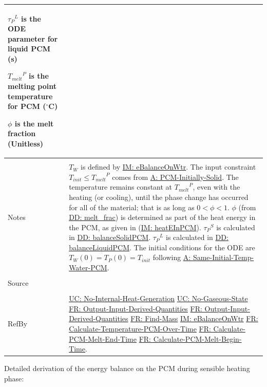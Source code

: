 \documentclass[12pt]{article}
\begin{document}
\begin{minipage}{\textwidth}
\begin{tabular}{p{} p{}}
\begin{symbDescription}
              \item{${{τ_{P}}^{L}}$ is the ODE parameter for liquid PCM (s)}
              \item{${{T_{melt}}^{P}}$ is the melting point temperature for PCM (${}^{\circ}$C)}
              \item{$ϕ$ is the melt fraction (Unitless)}
              \end{symbDescription}
\\ \midrule \\
Notes & ${T_{W}}$ is defined by \hyperref[IM:eBalanceOnWtr]{IM: eBalanceOnWtr}.
        The input constraint ${T_{init}}\leq{}{{T_{melt}}^{P}}$ comes from \hyperref[assumpPIS]{A: PCM-Initially-Solid}.
        The temperature remains constant at ${{T_{melt}}^{P}}$, even with the heating (or cooling), until the phase change has occurred for all of the material; that is as long as $0<ϕ<1$. $ϕ$ (from \hyperref[DD:melt.frac]{DD: melt\_frac}) is determined as part of the heat energy in the PCM, as given in (\hyperref[IM:heatEInPCM]{IM: heatEInPCM}).
        ${{τ_{P}}^{S}}$ is calculated in \hyperref[DD:balanceSolidPCM]{DD: balanceSolidPCM}.
        ${{τ_{P}}^{L}}$ is calculated in \hyperref[DD:balanceLiquidPCM]{DD: balanceLiquidPCM}.
        The initial conditions for the ODE are ${T_{W}}\left(0\right)={T_{P}}\left(0\right)={T_{init}}$ following \hyperref[assumpSITWP]{A: Same-Initial-Temp-Water-PCM}.
\\ \midrule \\
Source & \cite{koothoor2013}
\\ \midrule \\
RefBy & \hyperref[unlikeChgNIHG]{UC: No-Internal-Heat-Generation} \hyperref[unlikeChgNGS]{UC: No-Gaseous-State} \hyperref[outputInputDerivQuants]{FR: Output-Input-Derived-Quantities} \hyperref[outputInputDerivQuants]{FR: Output-Input-Derived-Quantities} \hyperref[findMass]{FR: Find-Mass} \hyperref[IM:eBalanceOnWtr]{IM: eBalanceOnWtr} \hyperref[calcTempPCMOverTime]{FR: Calculate-Temperature-PCM-Over-Time} \hyperref[calcPCMMeltEnd]{FR: Calculate-PCM-Melt-End-Time} \hyperref[calcPCMMeltBegin]{FR: Calculate-PCM-Melt-Begin-Time}.
\\ \bottomrule \end{tabular}
\end{minipage}
Detailed derivation of the energy balance on the PCM during sensible heating phase:
\end{document}
